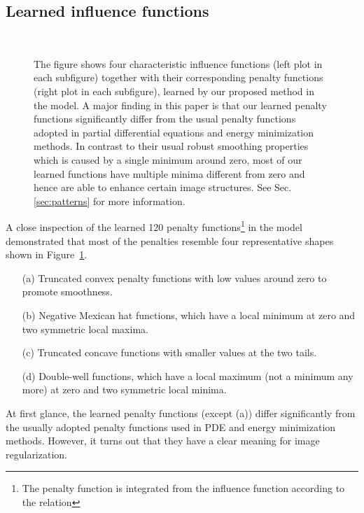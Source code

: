 \documentclass[10pt,journal,compsoc]{IEEEtran}
\begin{document}
\subsection{Learned influence functions} \label{influence}
\begin{figure}[t!]
\vspace*{-0.1cm}\centering
{}\hfill
{}\\
\vspace*{-0.3cm}
\hfill
{}
\caption{The figure shows four characteristic influence functions
  (left plot in each subfigure) together with their corresponding
  penalty functions (right plot in each subfigure), learned by our
  proposed method in the  model. A major finding in this paper is that our learned
  penalty functions significantly differ from the usual penalty
  functions adopted in partial differential equations and energy minimization
  methods. In contrast to their usual robust smoothing properties
  which is caused by a single minimum around zero, most of our learned
  functions have multiple minima different from zero and hence are
  able to enhance certain image structures. See Sec. \ref{sec:patterns} for more
  information.}\label{functions}
\vspace{-0.25cm}
\end{figure}
{
A close inspection of the learned 120 penalty functions\footnote{The penalty function  is integrated from the influence function  according 
to the relation }  in the 
model demonstrated that most of the penalties resemble four representative shapes 
shown in Figure~\ref{functions}.}
\begin{itemize}
\setlength\itemsep{0em}
\item[(a)] Truncated convex penalty functions with low values around
  zero to promote smoothness.
\item[(b)] Negative Mexican hat functions, which have a local minimum
  at zero and two symmetric local maxima.
\item[(c)] Truncated concave functions with smaller values at the two
  tails.
\item[(d)] Double-well functions, which have a local maximum (not a
  minimum any more) at zero and two symmetric local minima.
\end{itemize}
At first glance, the learned penalty functions (except (a)) differ
significantly from the usually adopted penalty functions used in PDE
and energy minimization methods. However, it turns out that they have
a clear meaning for image regularization.
\end{document}
